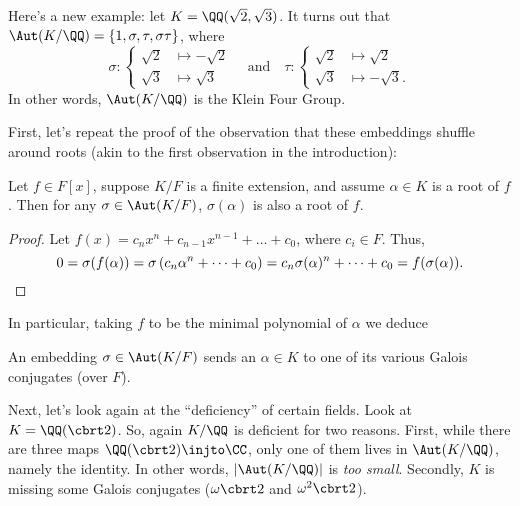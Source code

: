\begin{example}
	Here's a new example: let $K = \QQ(\sqrt2, \sqrt3)$.
	It turns out that $\Aut(K/\QQ) = \{1, \sigma, \tau, \sigma\tau\}$, where
	\[
		\sigma :
		\begin{cases}
			\sqrt2 &\mapsto -\sqrt2 \\
			\sqrt3 &\mapsto \sqrt3
		\end{cases}
		\quad\text{and}\quad
		\tau :
		\begin{cases}
			\sqrt2 &\mapsto \sqrt2 \\
			\sqrt3 &\mapsto -\sqrt3.
		\end{cases}
	\]
	In other words, $\Aut(K/\QQ)$ is the Klein Four Group.
\end{example}

First, let's repeat the proof of the observation that these embeddings shuffle around roots
(akin to the first observation in the introduction):
\begin{lemma}
	Let $f \in F[x]$, suppose $K/F$ is a finite extension,
	and assume $\alpha \in K$ is a root of $f$.
	Then for any $\sigma \in \Aut(K/F)$, $\sigma(\alpha)$ is also a root of $f$.
	\label{lem:root_shuffle}
\end{lemma}
\begin{proof}
	Let $f(x) = c_n x^n + c_{n-1}x^{n-1} + \dots + c_0$,
	where $c_i \in F$. Thus,
	\[ 0 = \sigma(f(\alpha)) = \sigma\left( c_n\alpha^n + \dots + c_0 \right)
	= c_n\sigma(\alpha)^n + \dots + c_0 = f(\sigma(\alpha)). \qedhere \]
\end{proof}
In particular, taking $f$ to be the minimal polynomial of $\alpha$ we deduce
\begin{moral}
	An embedding $\sigma \in \Aut(K/F)$ sends an $\alpha \in K$
	to one of its various Galois conjugates (over $F$).
\end{moral}

Next, let's look again at the ``deficiency'' of certain fields.
Look at $K = \QQ(\cbrt 2)$.
So, again $K / \QQ$ is deficient for two reasons.
First, while there are three maps $\QQ(\cbrt 2) \injto \CC$,
only one of them lives in $\Aut(K/\QQ)$, namely the identity.
In other words, $\left\lvert \Aut(K/\QQ) \right\rvert$ is \emph{too small}.
Secondly, $K$ is missing some Galois conjugates ($\omega \cbrt 2$ and $\omega^2 \cbrt 2$).

